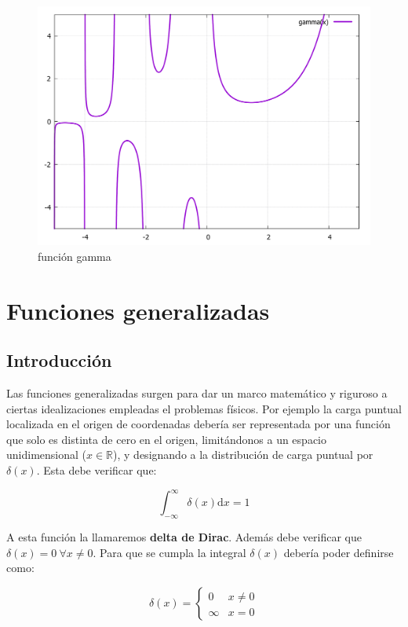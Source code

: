 \documentclass[12pt]{book}
\newcommand{\D}{\mathrm{d}}
\newcommand{\inti}{\int_{-\infty}^{\infty}}
\begin{document}
\begin{figure}[h!] \centering
\includegraphics[scale=0.5]{gammafunction.pdf}
\caption{función gamma}
\end{figure}

\newpage


\chapter{Funciones generalizadas}


\section{Introducción}

Las funciones generalizadas surgen para dar un marco matemático y riguroso a ciertas idealizaciones empleadas el problemas físicos. Por ejemplo la carga puntual localizada en el origen de coordenadas debería ser representada por una función que solo es distinta de cero en el origen, limitándonos a un espacio unidimensional ($x \in \mathbb{R}$), y designando a la distribución de carga puntual por $\delta (x)$. Esta debe verificar que:

\begin{equation}
\inti \delta (x) \D x = 1
\end{equation}

A esta función la llamaremos \textbf{delta de Dirac}. Además debe verificar que $\delta (x) = 0 \ \forall x \neq 0$. Para que se cumpla la integral $\delta (x)$ debería poder definirse como:

\begin{equation}
\delta (x) = \left\lbrace \begin{array}{ll}
0 & x \neq 0 \\
\infty & x = 0
\end{array}
\right.
\end{equation}
\end{document}
